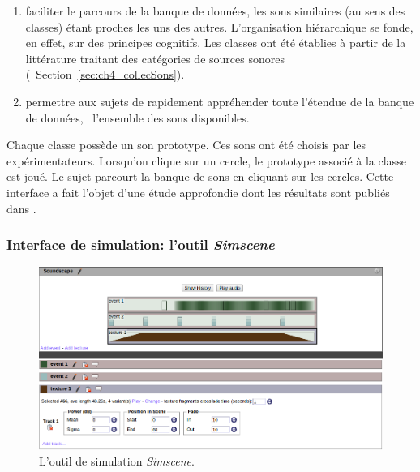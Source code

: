 \begin{enumerate}
\item faciliter le parcours de la banque de données, les sons similaires (au sens des classes) étant proches les uns des autres. L'organisation hiérarchique se fonde, en effet, sur des principes cognitifs. Les classes ont été établies à partir de la littérature traitant des catégories de sources sonores (\cf~Section~\ref{sec:ch4_collecSons}).
\item permettre aux sujets de rapidement appréhender toute l'étendue de la banque de données, \ie~l'ensemble des sons disponibles.
\end{enumerate}

Chaque classe possède un son prototype. Ces sons ont été choisis par les expérimentateurs. Lorsqu’on clique sur un cercle, le prototype associé à la classe est joué. Le sujet parcourt la banque de sons en cliquant sur les cercles. Cette interface a fait l'objet d'une étude approfondie dont les résultats sont publiés dans \citep{lafay2016JAES}.


\subsubsection{Interface de simulation: l'outil \emph{Simscene}}
\label{sec:ch4_simscene}

\begin{figure}[t]
        \myfloatalign
        \includegraphics[width=\linewidth]{gfx/ch_4/simscene}
       \caption{L'outil de simulation \emph{Simscene}.}\label{fig:simscene}
\end{figure}

